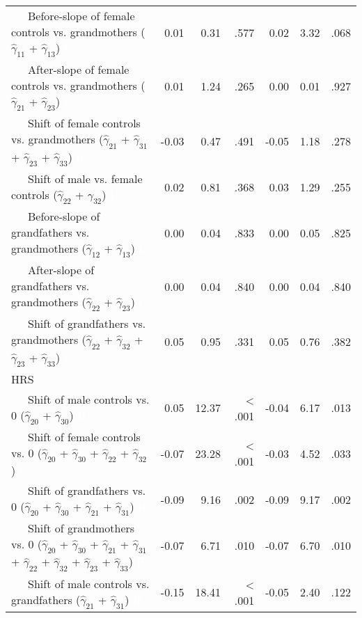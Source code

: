 \documentclass[
  english,
  man, noextraspace,floatsintext]{apa7}
\newenvironment{lltable}{\begin{landscape}\begin{center}\begin{ThreePartTable}}{\end{ThreePartTable}\end{center}\end{landscape}}
\begin{document}
\begin{appendix}
\begin{lltable}
{\begin{longtable}{lrrrrrr}
\ \ \ Before-slope of female controls vs. grandmothers 
($\hat{\gamma}_{11}$ + $\hat{\gamma}_{13}$) \textcolor{white}{L} & 0.01 & 0.31 & .577 & 0.02 & 3.32 & .068\\
\ \ \ After-slope of female controls vs. grandmothers 
($\hat{\gamma}_{21}$ + $\hat{\gamma}_{23}$) \textcolor{white}{L} & 0.01 & 1.24 & .265 & 0.00 & 0.01 & .927\\
\ \ \ Shift of female controls vs. grandmothers 
($\hat{\gamma}_{21}$ + $\hat{\gamma}_{31}$ + 
$\hat{\gamma}_{23}$ + $\hat{\gamma}_{33}$) \textcolor{white}{L} & -0.03 & 0.47 & .491 & -0.05 & 1.18 & .278\\
\ \ \ Shift of male vs. female controls 
($\hat{\gamma}_{22}$ + $\hat{\gamma}_{32}$) \textcolor{white}{L} & 0.02 & 0.81 & .368 & 0.03 & 1.29 & .255\\
\ \ \ Before-slope of grandfathers vs. grandmothers 
($\hat{\gamma}_{12}$ + $\hat{\gamma}_{13}$) \textcolor{white}{L} & 0.00 & 0.04 & .833 & 0.00 & 0.05 & .825\\
\ \ \ After-slope of grandfathers vs. grandmothers 
($\hat{\gamma}_{22}$ + $\hat{\gamma}_{23}$) \textcolor{white}{L} & 0.00 & 0.04 & .840 & 0.00 & 0.04 & .840\\
\ \ \ Shift of grandfathers vs. grandmothers 
($\hat{\gamma}_{22}$ + $\hat{\gamma}_{32}$ + 
$\hat{\gamma}_{23}$ + $\hat{\gamma}_{33}$) \textcolor{white}{L} & 0.05 & 0.95 & .331 & 0.05 & 0.76 & .382\\
HRS &  &  &  &  &  & \\
\ \ \ Shift of male controls vs. 0 ($\hat{\gamma}_{20}$ + 
$\hat{\gamma}_{30}$) \textcolor{white}{H} & 0.05 & 12.37 & < .001 & -0.04 & 6.17 & .013\\
\ \ \ Shift of female controls vs. 0 ($\hat{\gamma}_{20}$ + 
$\hat{\gamma}_{30}$ + $\hat{\gamma}_{22}$ + 
$\hat{\gamma}_{32}$) \textcolor{white}{H} & -0.07 & 23.28 & < .001 & -0.03 & 4.52 & .033\\
\ \ \ Shift of grandfathers vs. 0 ($\hat{\gamma}_{20}$ + 
$\hat{\gamma}_{30}$ + $\hat{\gamma}_{21}$ + 
$\hat{\gamma}_{31}$) \textcolor{white}{H} & -0.09 & 9.16 & .002 & -0.09 & 9.17 & .002\\
\ \ \ Shift of grandmothers vs. 0 ($\hat{\gamma}_{20}$ + 
$\hat{\gamma}_{30}$ + $\hat{\gamma}_{21}$ + 
$\hat{\gamma}_{31}$ + $\hat{\gamma}_{22}$ + 
$\hat{\gamma}_{32}$ + $\hat{\gamma}_{23}$ +
$\hat{\gamma}_{33}$) \textcolor{white}{H} & -0.07 & 6.71 & .010 & -0.07 & 6.70 & .010\\
\ \ \ Shift of male controls vs. grandfathers 
($\hat{\gamma}_{21}$ + $\hat{\gamma}_{31}$) \textcolor{white}{H} & -0.15 & 18.41 & < .001 & -0.05 & 2.40 & .122\\

\end{longtable}}
\end{lltable}
\end{appendix}
\end{document}
